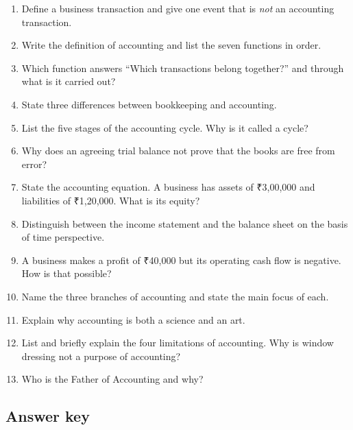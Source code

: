 \documentclass[11pt,a4paper]{article}
\newcommand{\Rs}{{\rsfont ₹}}
\begin{document}
\begin{enumerate}
  \item Define a business transaction and give one event that is \emph{not} an accounting transaction.
  \item Write the definition of accounting and list the seven functions in order.
  \item Which function answers ``Which transactions belong together?'' and through what is it carried out?
  \item State three differences between bookkeeping and accounting.
  \item List the five stages of the accounting cycle. Why is it called a cycle?
  \item Why does an agreeing trial balance not prove that the books are free from error?
  \item State the accounting equation. A business has assets of \Rs 3,00,000 and liabilities of
        \Rs 1,20,000. What is its equity?
  \item Distinguish between the income statement and the balance sheet on the basis of time perspective.
  \item A business makes a profit of \Rs 40,000 but its operating cash flow is negative. How is that possible?
  \item Name the three branches of accounting and state the main focus of each.
  \item Explain why accounting is both a science and an art.
  \item List and briefly explain the four limitations of accounting. Why is window dressing not a purpose of accounting?
  \item Who is the Father of Accounting and why?
\end{enumerate}

\subsection{Answer key}
\end{document}
